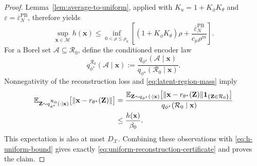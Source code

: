 \documentclass[10pt,a4paper]{amsart}
\begin{document}
\begin{proof}
Lemma~\ref{lem:average-to-uniform}, applied with $K_u=1+K_\phi K_\theta$ and $\varepsilon=\overline\varepsilon_N^{\mathrm{PB}}$, therefore yields
\begin{equation}
  \sup_{\mathbf{x}\in\mathcal{M}}h(\mathbf{x})
  \leq
  \inf_{0<\rho\leq\rho_0}
  \left[
    (1+K_\phi K_\theta)\rho
    +\frac{\overline\varepsilon_N^{\mathrm{PB}}}
           {c_\mu\rho^m}
  \right].
  \label{eq:h-uniform-bound}
\end{equation}
For a Borel set $\mathcal{A}\subseteq\mathcal{R}_0$, define the conditioned encoder law
\begin{equation}
  q_{\phi^\star}^{\mathcal{R}_0}(\mathcal{A}\mid\mathbf{x})
  :=\frac{q_{\phi^\star}(\mathcal{A}\mid\mathbf{x})}
          {q_{\phi^\star}(\mathcal{R}_0\mid\mathbf{x})}.
  \label{eq:conditioned-encoder}
\end{equation}
Nonnegativity of the reconstruction loss and \eqref{eq:latent-region-mass} imply
\begin{align}
  \mathbb{E}_{\mathbf{Z}\sim
    q_{\phi^\star}^{\mathcal{R}_0}(\cdot\mid\mathbf{x})}
    \bigl[\|\mathbf{x}-r_{\theta^\star}(\mathbf{Z})\|\bigr]
  &=
  \frac{
    \mathbb{E}_{\mathbf{Z}\sim q_{\phi^\star}(\cdot\mid\mathbf{x})}
      \bigl[\|\mathbf{x}-r_{\theta^\star}(\mathbf{Z})\|
        \mathbf{1}_{\{\mathbf{Z}\in\mathcal{R}_0\}}\bigr]
  }{q_{\phi^\star}(\mathcal{R}_0\mid\mathbf{x})}
  \notag\\
  &\leq \frac{h(\mathbf{x})}{\beta_0}.
  \label{eq:conditioning-penalty}
\end{align}
This expectation is also at most $D_{\mathcal{X}}$.  Combining these observations with \eqref{eq:h-uniform-bound} gives exactly \eqref{eq:uniform-reconstruction-certificate} and proves the claim.
\end{proof}
\end{document}
